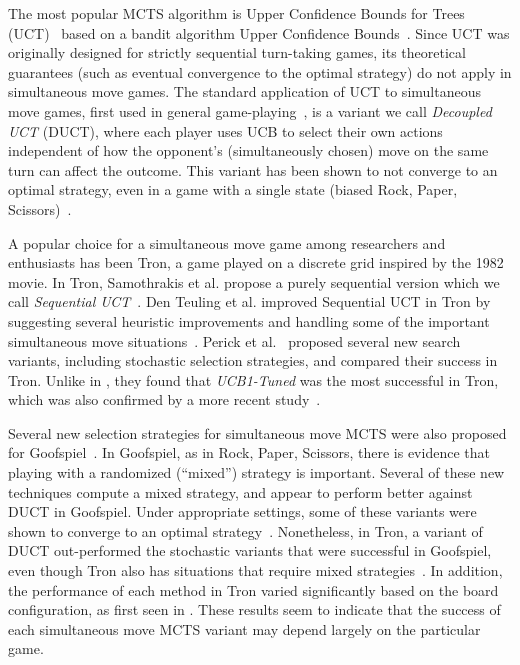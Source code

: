 \documentclass[conference]{IEEEtran}
\begin{document}
The most popular MCTS algorithm is Upper Confidence Bounds for Trees (UCT)~\cite{Kocsis06Bandit} based on a bandit algorithm 
Upper Confidence Bounds~\cite{Auer02Finite}. Since UCT was originally 
designed for strictly sequential turn-taking games, its theoretical guarantees (such as eventual convergence to the optimal 
strategy) do not apply in simultaneous move games. The standard application of UCT to simultaneous move games, first used in 
general game-playing~\cite{Finnsson08}, is a variant we call {\it Decoupled UCT} (DUCT), where each player uses UCB to select 
their own actions independent of how the opponent's (simultaneously chosen) move on the same turn can affect the outcome. 
This variant has been shown to not converge to an optimal strategy, even in a game with a single state (biased Rock, Paper, 
Scissors)~\cite{Shafiei09}. 

A popular choice for a simultaneous move game among researchers and enthusiasts has been Tron, a game played on a discrete 
grid inspired by the 1982 movie.
In Tron, Samothrakis et al. propose a purely sequential version which we call {\it Sequential UCT}~\cite{Samothrakis10Tron}. 
Den Teuling et al. improved Sequential UCT in Tron by suggesting several heuristic improvements and handling some of the 
important simultaneous move situations~\cite{DenTeuling12Tron}. Perick et al.~\cite{Perick12Comparison} proposed several new 
search variants, including stochastic selection strategies, and compared their success in Tron. Unlike in \cite{Samothrakis10Tron}, 
they found that {\it UCB1-Tuned} was the most successful in Tron, which was also confirmed by a more recent study~\cite{Lanctot13Tron}.

Several new selection strategies for simultaneous move MCTS were also proposed for Goofspiel~\cite{Lanctot13Goofspiel}. In Goofspiel, 
as in Rock, Paper, Scissors, there is evidence that playing with a randomized (``mixed'') strategy is important. 
Several of these new techniques compute a mixed strategy, and appear to perform better against DUCT in Goofspiel. 
Under appropriate settings, some of these variants were shown to converge to an optimal strategy~\cite{Lisy13Computing}. 
Nonetheless, in Tron, a variant of DUCT out-performed the stochastic variants that were successful in Goofspiel, even though Tron 
also has situations that require mixed strategies~\cite{Lanctot13Tron}. 
In addition, the performance of each method in Tron varied significantly based on the board configuration, as first seen 
in \cite{DenTeuling12Tron}.
These results seem to indicate that the success of each simultaneous move MCTS variant may depend largely on the particular game. 
\end{document}
